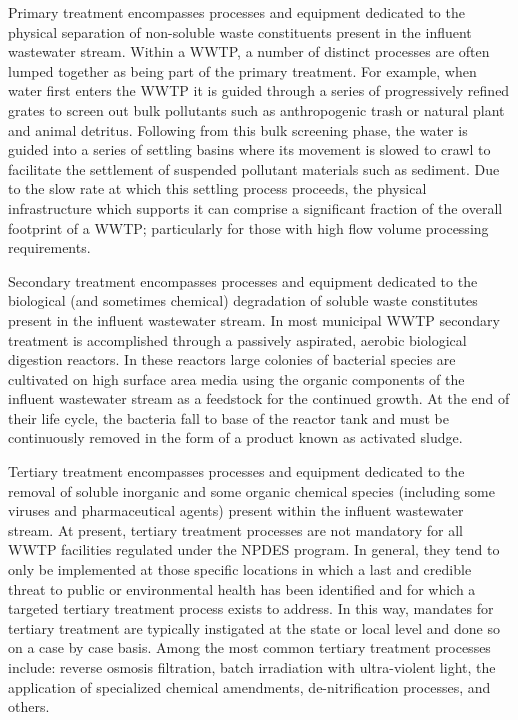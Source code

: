 Primary treatment encompasses processes and equipment dedicated to the physical separation of non-soluble waste constituents present in the influent wastewater stream. Within a WWTP, a number of distinct processes are often lumped together as being part of the primary treatment. For example, when water first enters the WWTP it is guided through a series of progressively refined grates to screen out bulk pollutants such as anthropogenic trash or natural plant and animal detritus. Following from this bulk screening phase, the water is guided into a series of settling basins where its movement is slowed to crawl to facilitate the settlement of suspended pollutant materials such as sediment. Due to the slow rate at which this settling process proceeds, the physical infrastructure which supports it can comprise a significant fraction of the overall footprint of a WWTP; particularly for those with high flow volume processing requirements.

Secondary treatment encompasses processes and equipment dedicated to the biological (and sometimes chemical) degradation of soluble waste constitutes present in the influent wastewater stream. In most municipal WWTP secondary treatment is accomplished through a passively aspirated, aerobic biological digestion reactors. In these reactors large colonies of bacterial species are cultivated on high surface area media using the organic components of the influent wastewater stream as a feedstock for the continued growth. At the end of their life cycle, the bacteria fall to base of the reactor tank and must be continuously removed in the form of a product known as activated sludge.

Tertiary treatment encompasses processes and equipment dedicated to the removal of soluble inorganic and some organic chemical species (including some viruses and pharmaceutical agents) present within the influent wastewater stream. At present, tertiary treatment processes are not mandatory for all WWTP facilities regulated under the NPDES program. In general, they tend to only be implemented at those specific locations in which a last and credible threat to public or environmental health has been identified and for which a targeted tertiary treatment process exists to address. In this way, mandates for tertiary treatment are typically instigated at the state or local level and done so on a case by case basis. Among the most common tertiary treatment processes include: reverse osmosis filtration, batch irradiation with ultra-violent light, the application of specialized chemical amendments, de-nitrification processes, and others.

